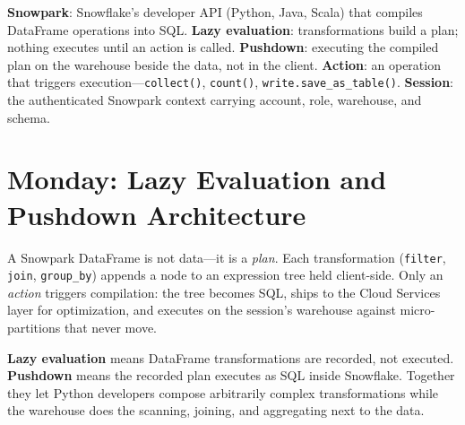 \begin{keyterms}
\textbf{Snowpark}: Snowflake's developer API (Python, Java, Scala) that compiles DataFrame operations into SQL.\quad
\textbf{Lazy evaluation}: transformations build a plan; nothing executes until an action is called.\quad
\textbf{Pushdown}: executing the compiled plan on the warehouse beside the data, not in the client.\quad
\textbf{Action}: an operation that triggers execution---\texttt{collect()}, \texttt{count()}, \texttt{write.save\_as\_table()}.\quad
\textbf{Session}: the authenticated Snowpark context carrying account, role, warehouse, and schema.
\end{keyterms}

\section{Monday: Lazy Evaluation and Pushdown Architecture}
A Snowpark DataFrame is not data---it is a \emph{plan}. Each transformation (\texttt{filter}, \texttt{join}, \texttt{group\_by}) appends a node to an expression tree held client-side. Only an \emph{action} triggers compilation: the tree becomes SQL, ships to the Cloud Services layer for optimization, and executes on the session's warehouse against micro-partitions that never move.

\begin{definitionbox}
\textbf{Lazy evaluation} means DataFrame transformations are recorded, not executed. \textbf{Pushdown} means the recorded plan executes as SQL inside Snowflake. Together they let Python developers compose arbitrarily complex transformations while the warehouse does the scanning, joining, and aggregating next to the data.
\end{definitionbox}


